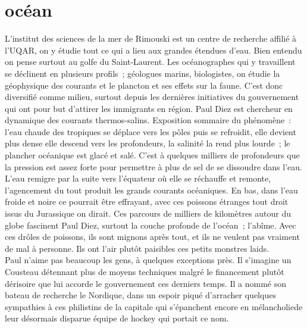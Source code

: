 \clearpage
\section*{océan}

L’institut des sciences de la mer de Rimouski est un centre de recherche
affilié à l’UQAR, on y étudie tout ce qui a lieu aux grandes étendues d’eau.
Bien entendu on pense surtout au golfe du Saint-Laurent. Les océanographes qui
y travaillent se déclinent en plusieurs profils ; géologues marins,
biologistes, on étudie la géophysique des courants et le plancton et ses effets
sur la faune.  C’est donc diversifié comme milieu, surtout depuis les dernières
initiatives du gouvernement qui ont pour but d’attirer les immigrants en
région. Paul Diez est chercheur en dynamique des courants thermos-salins.
Exposition sommaire du phénomène : l’eau chaude des tropiques se déplace vers
les pôles puis se refroidit, elle devient plus dense elle descend vers les
profondeurs, la salinité la rend plus lourde ; le plancher océanique est glacé
et salé. C’est à quelques milliers de profondeurs que la pression est assez
forte pour permettre à plus de sel de se dissoudre dans l’eau.\\

L’eau remigre par la suite vers l’équateur où elle se réchauffe et remonte,
l’agencement du tout produit les grands courants océaniques. En bas, dans l’eau
froide et noire ce pourrait être effrayant, avec ces poissons étranges tout
droit issus du Jurassique on dirait. Ces parcours de milliers de kilomètres
autour du globe fascinent Paul Diez, surtout la couche profonde de l’océan ;
l’abîme. Avec ces drôles de poissons, ils sont mignons après tout, et ils ne
veulent pas vraiment de mal à personne. Ils ont l’air plutôt paisibles ces
petits monstres laids.\\

Paul n'aime pas beaucoup les gens, à quelques exceptions près. Il s'imagine un 
Cousteau détennant plus de moyens techniques malgré le financement plutôt 
dérisoire que lui accorde le gouvernement ces derniers temps. Il a nommé son
bateau de recherche le Nordique, dans un espoir piqué d'arracher quelques
sympathies à ces philistins de la capitale qui s'épanchent encore en mélancholiede leur désormais disparue équipe de hockey qui portait ce nom.



